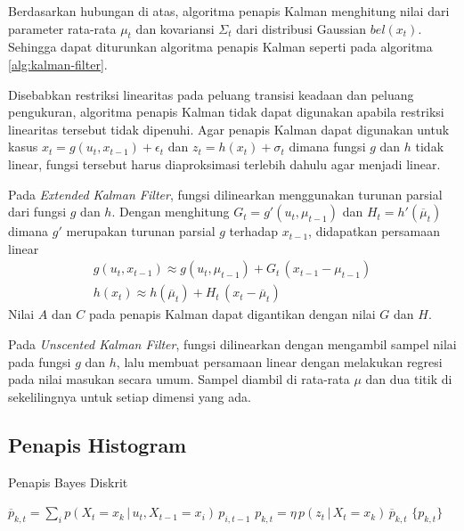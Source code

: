 Berdasarkan hubungan di atas, algoritma penapis Kalman menghitung nilai dari parameter rata-rata $\mu_t$ dan kovariansi $\Sigma_t$ dari distribusi Gaussian $bel(x_t)$. Sehingga dapat diturunkan algoritma penapis Kalman seperti pada algoritma \ref{alg:kalman-filter}.

Disebabkan restriksi linearitas pada peluang transisi keadaan dan peluang pengukuran, algoritma penapis Kalman tidak dapat digunakan apabila restriksi linearitas tersebut tidak dipenuhi. Agar penapis Kalman dapat digunakan untuk kasus $x_t = g(u_t, x_{t-1}) + \epsilon_t$ dan $z_t = h(x_t) + \sigma_t$ dimana fungsi $g$ dan $h$ tidak linear, fungsi tersebut harus diaproksimasi terlebih dahulu agar menjadi linear.

Pada \textit{Extended Kalman Filter}, fungsi dilinearkan menggunakan turunan parsial dari fungsi $g$ dan $h$. Dengan menghitung $G_t = g'(u_t, \mu_{t-1})$ dan $H_t = h'(\overline{\mu}_t)$ dimana $g'$ merupakan turunan parsial $g$ terhadap $x_{t-1}$, didapatkan persamaan linear
\begin{align}
    g(u_t, x_{t-1}) \approx g(u_t, \mu_{t-1}) + G_t\, (x_{t-1} - \mu_{t-1}) \\
    h(x_t) \approx h(\overline{\mu}_t) + H_t\, (x_t - \overline{\mu}_t)
\end{align}
Nilai $A$ dan $C$ pada penapis Kalman dapat digantikan dengan nilai $G$ dan $H$.

Pada \textit{Unscented Kalman Filter}, fungsi dilinearkan dengan mengambil sampel nilai pada fungsi $g$ dan $h$, lalu membuat persamaan linear dengan melakukan regresi pada nilai masukan secara umum. Sampel diambil di rata-rata $\mu$ dan dua titik di sekelilingnya untuk setiap dimensi yang ada.

\subsection{Penapis Histogram}

\begin{algorithm}
    \caption{Penapis Bayes Diskrit}
    \label{alg:discrete-bayes-filter}
    \begin{algorithmic}[1]
        \State $\overline{p}_{k, t} = \sum_i p(X_t = x_k \,|\, u_t, X_{t-1} = x_i)\, p_{i, t-1}$
        \State $p_{k, t} = \eta\, p(z_t \,|\, X_t = x_k)\, \overline{p}_{k, t}$ 
        \EndFor
        \State \Return $\{p_{k, t}\}$
        \EndFunction
    \end{algorithmic}
\end{algorithm}

